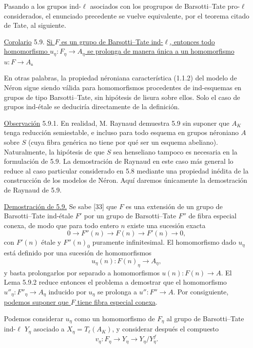 Pasando a los grupos ind-$\ell$ asociados con los progrupos de
Barsotti--Tate pro-$\ell$ considerados, el enunciado precedente se
vuelve equivalente, por el teorema citado de Tate, al siguiente.

\medskip
\noindent
\underline{Corolario} 5.9. \underline{Si $F$ es un grupo de
Barsotti--Tate ind-$\ell$, entonces todo homomorfismo
$u_\eta:F_\eta\longrightarrow A_\eta$ se prolonga de manera única a un
homomorfismo $u:F\longrightarrow A$.}

En otras palabras, la propiedad néroniana característica (1.1.2) del
modelo de Néron sigue siendo válida para homomorfismos procedentes de
ind-esquemas en grupos de tipo Barsotti--Tate, sin hipótesis de lisura
sobre ellos. Solo el caso de grupos ind-étale se deduciría directamente
de la definición.


\medskip
\noindent
\underline{Observación} 5.9.1. En realidad, M. Raynaud demuestra 5.9
sin suponer que $A_K$ tenga reducción semiestable, e incluso para todo
esquema en grupos néroniano $A$ sobre $S$ (cuya fibra genérica no tiene
por qué ser un esquema abeliano). Naturalmente, la hipótesis de que $S$
sea henseliano tampoco es necesaria en la formulación de 5.9. La
demostración de Raynaud en este caso más general lo reduce al caso
particular considerado en 5.8 mediante una propiedad inédita de la
construcción de los modelos de Néron. Aquí daremos únicamente la
demostración de Raynaud de 5.9.

\medskip
\noindent
\underline{Demostración de 5.9.} Se sabe [33] que $F$ es una extensión
de un grupo de Barsotti--Tate ind-étale $F'$ por un grupo de
Barsotti--Tate $F''$ de fibra especial conexa, de modo que para todo
entero $n$ existe una sucesión exacta
\[
 0\longrightarrow F''(n)\longrightarrow F(n)
 \longrightarrow F'(n)\longrightarrow0,
\]
con $F'(n)$ étale y $F''(n)_0$ puramente infinitesimal. El homomorfismo
dado $u_\eta$ está definido por una sucesión de homomorfismos
\[
 u_\eta(n):F(n)_\eta\longrightarrow A_\eta,
\]
y basta prolongarlos por separado a homomorfismos
$u(n):F(n)\longrightarrow A$. El Lema 5.9.2 reduce entonces el problema
a demostrar que el homomorfismo
$u''_\eta:F''_\eta\longrightarrow A_\eta$ inducido por $u_\eta$ se
prolonga a $u'':F''\longrightarrow A$. Por consiguiente,
\underline{podemos suponer que $F$ tiene fibra especial conexa}.

Podemos considerar $u_\eta$ como un homomorfismo de $F_\eta$ al grupo
de Barsotti--Tate ind-$\ell$ $Y_\eta$ asociado a
$X_\eta=T_\ell(A_K)$, y considerar después el compuesto
\begin{equation}\tag{*}
 v_\eta:F_\eta\longrightarrow Y_\eta
 \longrightarrow Y_\eta/Y_\eta^f.
\end{equation}

